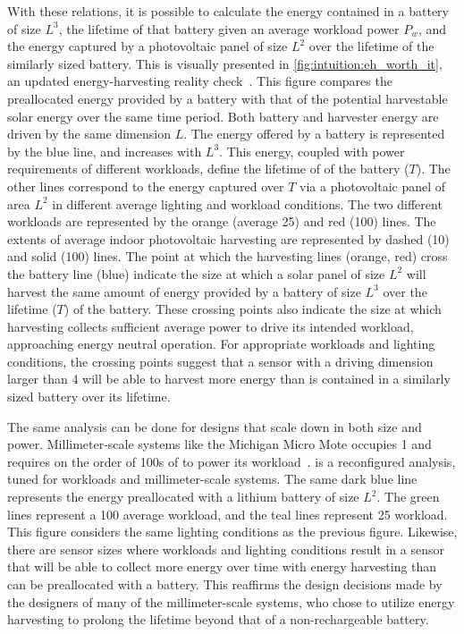With these relations, it is possible to calculate the energy contained in a battery of size $L^3$, the lifetime of that battery given an average workload power $P_w$, and the energy captured by a photovoltaic panel of size $L^2$ over the lifetime of the similarly sized battery.
This is visually presented in \cref{fig:intuition:eh_worth_it}, 
an updated energy-harvesting reality check~\cite{yervaGrafting12}. 
This figure compares the preallocated energy provided by a battery with that of the potential harvestable solar energy over the same time period. 
Both battery and harvester energy are driven by the same dimension $L$. 
The energy offered by a battery is represented by the blue line, and increases with $L^3$.
This energy, coupled with power requirements of different workloads, define the lifetime of of the battery ($T$).
The other lines correspond to the energy captured over $T$ via a photovoltaic panel of area $L^2$ in different average lighting and workload conditions.
The two different workloads are represented by the orange (average 25\ssi{\micro\watt}) and red (100\ssi{\micro\watt}) lines.
The extents of average indoor photovoltaic harvesting are represented by dashed 
(10\ssi[per-mode=symbol]{\micro\watt\per\centi\meter\squared}) and solid 
(100\ssi[per-mode=symbol]{\micro\watt\per\centi\meter\squared}) lines. 
The point at which the harvesting lines (orange, red) cross the battery line (blue) indicate the size at which a solar panel of size $L^2$ will harvest the same amount of energy provided by a battery of size $L^3$ over the lifetime ($T$) of the battery. 
These crossing points also indicate the size at which harvesting collects sufficient average power to drive its intended workload, approaching energy neutral operation.
For appropriate workloads and lighting conditions, the crossing points suggest that a sensor with a driving dimension larger than 4\ssi{\centi\meter} will be able to harvest more energy than is contained in a similarly sized battery over its lifetime.


The same analysis can be done for designs that scale down in both size and power. Millimeter-scale systems like the Michigan Micro Mote occupies 1\ssi{\milli\meter\squared} and requires on the order of 100s of \ssi{\nano\watt} to power its workload~\cite{lee2013modular}.
 is a reconfigured analysis, tuned for \ssi{\nano\watt} workloads and millimeter-scale systems. The same dark blue line represents the energy preallocated with a lithium battery of size $L^2$. The green lines represent a 100\ssi{\nano\watt} average workload, and the teal lines represent 25\ssi{\nano\watt} workload. This figure considers the same lighting conditions as the previous figure.
Likewise, there are sensor sizes where workloads and lighting conditions result in a sensor that will be able to collect more energy over time with energy harvesting than can be preallocated with a battery.
This reaffirms the design decisions made by the designers of many of the millimeter-scale systems, who chose to utilize energy harvesting to prolong the lifetime beyond that of a non-rechargeable battery. 

